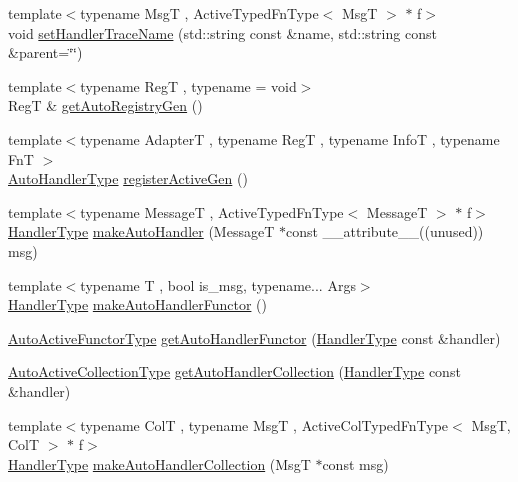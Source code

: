 \begin{DoxyCompactItemize}
\item 
{\footnotesize template$<$typename MsgT , Active\+Typed\+Fn\+Type$<$ Msg\+T $>$ $\ast$ f$>$ }\\void \hyperlink{namespacevt_1_1auto__registry_a9239b3d69aac342e6b7d7554ef84a9cc}{set\+Handler\+Trace\+Name} (std\+::string const \&name, std\+::string const \&parent=\char`\"{}\char`\"{})
\item 
{\footnotesize template$<$typename RegT , typename  = void$>$ }\\RegT \& \hyperlink{namespacevt_1_1auto__registry_ab2ee3a933397aba4f50be12646be5fa7}{get\+Auto\+Registry\+Gen} ()
\item 
{\footnotesize template$<$typename AdapterT , typename RegT , typename InfoT , typename FnT $>$ }\\\hyperlink{namespacevt_1_1auto__registry_ae295e18699146815bb7d7674594d95d7}{Auto\+Handler\+Type} \hyperlink{namespacevt_1_1auto__registry_aa16ec3feb8483e91ba4775b634ba0c65}{register\+Active\+Gen} ()
\item 
{\footnotesize template$<$typename MessageT , Active\+Typed\+Fn\+Type$<$ Message\+T $>$ $\ast$ f$>$ }\\\hyperlink{namespacevt_af64846b57dfcaf104da3ef6967917573}{Handler\+Type} \hyperlink{namespacevt_1_1auto__registry_aac5526933f7673de327d2becfc4577d2}{make\+Auto\+Handler} (MessageT $\ast$const \+\_\+\+\_\+attribute\+\_\+\+\_\+((unused)) msg)
\item 
{\footnotesize template$<$typename T , bool is\+\_\+msg, typename... Args$>$ }\\\hyperlink{namespacevt_af64846b57dfcaf104da3ef6967917573}{Handler\+Type} \hyperlink{namespacevt_1_1auto__registry_a473fb7ec675cc28fde0d6b0c5b19ac19}{make\+Auto\+Handler\+Functor} ()
\item 
\hyperlink{namespacevt_1_1auto__registry_a0efe8e4e502d6a88a8eb50d7d909228d}{Auto\+Active\+Functor\+Type} \hyperlink{namespacevt_1_1auto__registry_ac5906cc1ef94ef7e40eb4416d5acb9d5}{get\+Auto\+Handler\+Functor} (\hyperlink{namespacevt_af64846b57dfcaf104da3ef6967917573}{Handler\+Type} const \&handler)
\item 
\hyperlink{namespacevt_1_1auto__registry_a3a45df4bb1c58e5178e3c0cf349baea4}{Auto\+Active\+Collection\+Type} \hyperlink{namespacevt_1_1auto__registry_a57222c242fd475430d4c192ca85edd17}{get\+Auto\+Handler\+Collection} (\hyperlink{namespacevt_af64846b57dfcaf104da3ef6967917573}{Handler\+Type} const \&handler)
\item 
{\footnotesize template$<$typename ColT , typename MsgT , Active\+Col\+Typed\+Fn\+Type$<$ Msg\+T, Col\+T $>$ $\ast$ f$>$ }\\\hyperlink{namespacevt_af64846b57dfcaf104da3ef6967917573}{Handler\+Type} \hyperlink{namespacevt_1_1auto__registry_abe30cab2f560eb4dc314372af4263275}{make\+Auto\+Handler\+Collection} (MsgT $\ast$const msg)

\end{DoxyCompactItemize}

